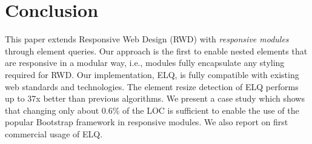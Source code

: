 \documentclass[sigplan,9pt]{acmart}
\newcommand{\elq}{ELQ}
\begin{document}
  \section{Conclusion}\label{sec:conclusion}
    This paper extends Responsive Web Design (RWD) with {\em responsive
      modules} through element queries.  Our approach is the first to
    enable nested elements that are responsive in a modular way, i.e.,
    modules fully encapsulate any styling required for RWD.  Our
    implementation, \elq{}, is fully compatible with existing web
    standards and technologies. The element resize detection of \elq{}
    performs up to 37x better than previous algorithms.  We present a
    case study which shows that changing only about 0.6\% of the LOC is
    sufficient to enable the use of the popular Bootstrap framework in
    responsive modules.  We also report on first commercial usage of
    \elq{}.



\end{document}
